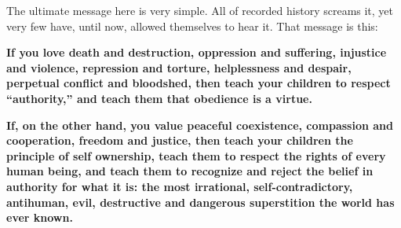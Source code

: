 \documentclass{book}
\begin{document}
The ultimate message here is very simple. All of recorded history screams it, yet very few have, until now, allowed themselves to hear it. That message is this:

\textbf{If you love death and destruction, oppression and suffering, injustice and violence, repression and torture, helplessness and despair, perpetual conflict and bloodshed, then teach your children to respect \enquote{authority,} and teach them that obedience is a virtue.}

\textbf{If, on the other hand, you value peaceful coexistence, compassion and cooperation, freedom and justice, then teach your children the principle of self ownership, teach them to respect the rights of every human being, and teach them to recognize and reject the belief in authority for what it is: the most irrational, self-contradictory, antihuman, evil, destructive and dangerous superstition the world has ever known.}
\end{document}
